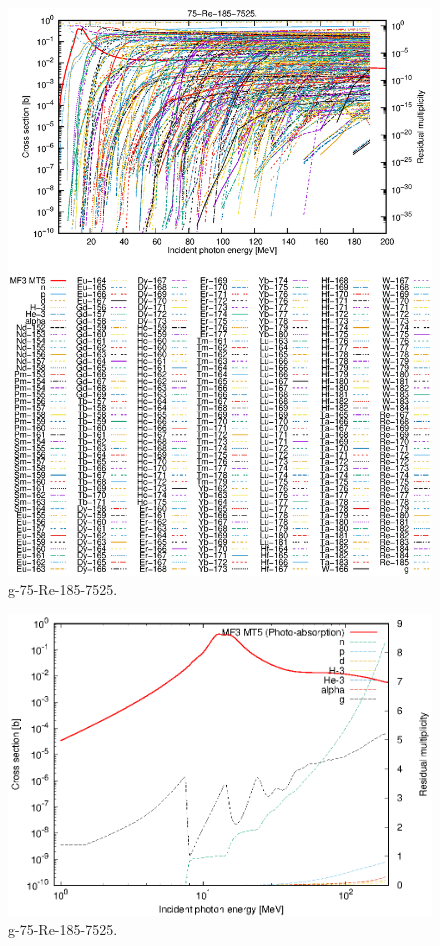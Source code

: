 \begin{figure}
 \includegraphics[width=\linewidth]{eps/g_75-Re-185_7525.eps}
  \caption{g-75-Re-185-7525.}
\end{figure}
\newpage \clearpage

\begin{figure}
 \includegraphics[width=\linewidth]{eps-log/g_75-Re-185_7525.eps}
 \caption{g-75-Re-185-7525.}
\end{figure}
\newpage \clearpage

